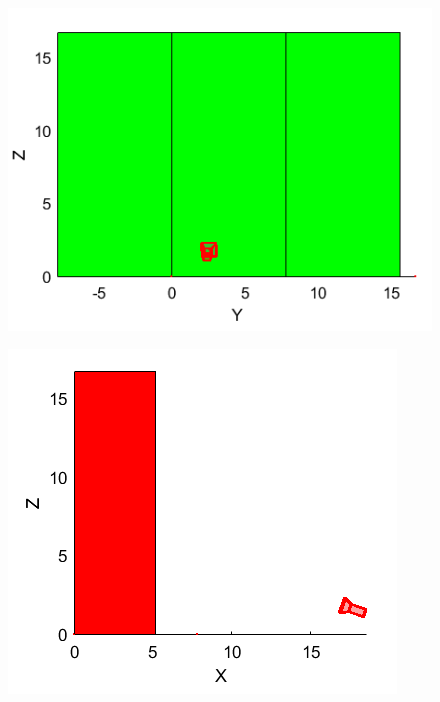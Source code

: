 \documentclass[11pt, oneside]{article}
\begin{document}
\begin{figure}[!h]
	\centering
	\begin{minipage}{.48\textwidth}
		\centering
		\includegraphics[scale = 0.8]{camera_localization_YZ.png}
		\label{camera_localization_YZ}
	\end{minipage}%
	\begin{minipage}{.55\textwidth}
		\centering
		\includegraphics[scale = 0.81]{camera_localization_XZ.png}
		\label{camera_localization_XZ}
	\end{minipage}
\end{figure}
\end{document}
